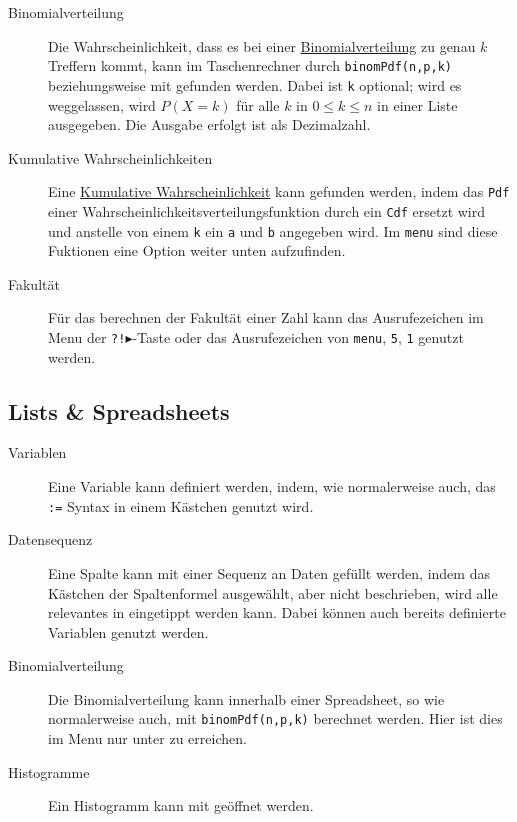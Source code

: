 \documentclass{article}
\begin{document}
\begin{description}
 \item[Binomialverteilung] Die Wahrscheinlichkeit, dass es bei einer \hyperref[Binomialverteilungen]{Binomialverteilung} zu genau $k$ Treffern kommt, kann im Taschenrechner durch \texttt{binomPdf(n,p,k)} beziehungsweise mit  \arrow {} \arrow {} \arrow {} gefunden werden. Dabei ist \texttt{k} optional; wird es weggelassen, wird $P(X=k)$ für alle $k$ in $0 \leq k \leq n$ in einer Liste ausgegeben. Die Ausgabe erfolgt ist als Dezimalzahl.
 \item[Kumulative Wahrscheinlichkeiten] Eine \hyperref[Kumulative Wahrscheinlichkeiten]{Kumulative Wahrscheinlichkeit} kann gefunden werden, indem das \texttt{Pdf} einer Wahrscheinlichkeitsverteilungsfunktion durch ein \texttt{Cdf} ersetzt wird und anstelle von einem \texttt{k} ein \texttt{a} und \texttt{b} angegeben wird. Im \texttt{menu} sind diese Fuktionen eine Option weiter unten aufzufinden.
 \item[Fakultät] Für das berechnen der Fakultät einer Zahl kann das Ausrufezeichen im Menu der \texttt{?!$\blacktriangleright$}-Taste oder das Ausrufezeichen von \texttt{menu}, \texttt{5}, \texttt{1} genutzt werden.  
\end{description} 
 
\subsection{Lists \& Spreadsheets}
\begin{description}
 \item[Variablen] Eine Variable kann definiert werden, indem, wie normalerweise auch, das \texttt{:=} Syntax in einem Kästchen genutzt wird. 
 \item[Datensequenz] Eine Spalte kann mit einer Sequenz an Daten gefüllt werden, indem das Kästchen der Spaltenformel ausgewählt, aber nicht beschrieben, wird alle relevantes in  \arrow {} \arrow {} eingetippt werden kann. Dabei können auch bereits definierte Variablen genutzt werden.
 \item[Binomialverteilung] Die Binomialverteilung kann innerhalb einer Spreadsheet, so wie normalerweise auch, mit \texttt{binomPdf(n,p,k)} berechnet werden. Hier ist dies im Menu nur unter  \arrow {} \arrow {} \arrow {} zu erreichen.
 \item[Histogramme] Ein Histogramm kann mit  \arrow {} \arrow {} geöffnet werden.
\end{description}  
\end{document}

